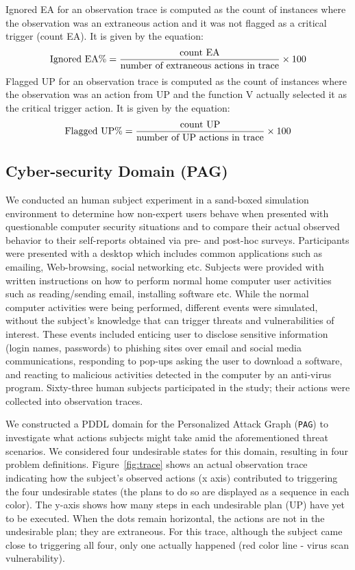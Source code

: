 Ignored EA for an observation trace is computed as the count of instances where the observation was an extraneous action and it was not flagged as a critical trigger (count EA). It is given by the equation:
\begin{equation}
\textup{Ignored EA}\%= \frac{\textup{count EA}}{\textup{number of extraneous actions in trace}}\times 100
\end{equation}
Flagged UP for an observation trace is computed as the count of instances where the observation was an action from UP and the function V actually selected it as the critical trigger action. It is given by the equation:
\begin{equation}
\textup{Flagged UP}\%= \frac{\textup{count UP}}{\textup{number of UP actions in trace}}\times 100
\end{equation}

\subsection{Cyber-security Domain (PAG)}
We conducted an human subject experiment in a sand-boxed simulation environment to determine how non-expert users behave when presented with questionable computer security situations and to compare their actual observed behavior to their self-reports obtained via pre- and post-hoc surveys. Participants were presented with a desktop which includes common applications such as emailing, Web-browsing, social networking etc. Subjects were provided with written instructions on how to perform normal home computer user activities such as reading/sending email, installing software etc. While the normal computer activities were being performed, different events were simulated, without the subject's knowledge that can trigger threats and vulnerabilities of interest. These events included enticing user to disclose sensitive information (login names, passwords) to phishing sites over email and social media communications, responding to pop-ups asking the user to download a software, and reacting to malicious activities detected in the computer by an anti-virus program. Sixty-three human subjects participated in the study; their actions were collected into observation traces.


We constructed a PDDL domain for the Personalized Attack Graph (\texttt{PAG}) to investigate what actions subjects might take amid the aforementioned threat scenarios.  We considered four undesirable states for this domain, resulting in four problem definitions. Figure~\ref{fig:trace} shows an actual observation trace indicating how the subject's observed actions (x axis) contributed to triggering the four undesirable states (the plans to do so are displayed as a sequence in each color). The y-axis shows how many steps in each undesirable plan (UP) have yet to be executed. When the dots remain horizontal, the actions are not in the undesirable plan; they are extraneous. For this trace, although the subject came close to triggering all four, only one actually happened (red color line - virus scan vulnerability). 


